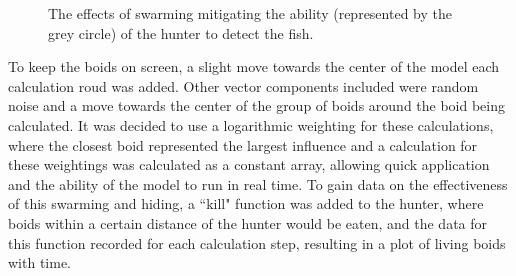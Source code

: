 \documentclass[
reprint,
showpacs,preprintnumbers,
amsmath,amssymb,
prl,
]{revtex4-1}
\begin{document}
\begin{figure}[!htp] %
		\label{fig:swarming}
		\label{fig:noswarming}
		
	\caption{The effects of swarming mitigating the ability (represented by the grey circle) of the hunter to detect the fish.\cite{underwatervision}}

	\label{fig:swarmblindness}
\end{figure}

To keep the boids on screen, a slight move towards the center of the model each calculation roud was added.
Other vector components included were random noise and a move towards the center of the group of boids around the boid being calculated.
It was decided to use a logarithmic weighting for these calculations, where the closest boid represented the largest influence and a calculation for these weightings was calculated as a constant array, allowing quick application and the ability of the model to run in real time.
To gain data on the effectiveness of this swarming and hiding, a ``kill" function was added to the hunter, where boids within a certain distance of the hunter would be eaten, and the data for this function recorded for each calculation step, resulting in a plot of living boids with time.


	
	
\end{document}
